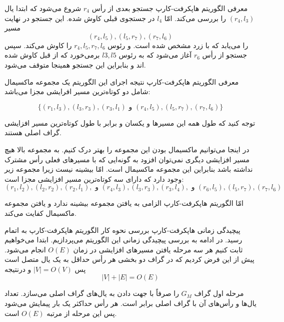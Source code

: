 \begin{itemframe}{‌معرفی الگوریتم هاپکرفت-کارپ}
\itm
 جستجو بعدی از رأس
$r_4$
شروع می‌شود که ابتدا یال
$(r_4, l_3)$
را بررسی می‌کند. امّا
$l_4$
در جستجوی قبلی کاوش شده. این جستجو در نهایت مسیر
$$(r_4, l_5), (l_5, r_7), (r_7, l_6)$$
را می‌یابد که با زرد مشخص شده است. و رئوس
$r_4, l_5, r_7, l_6$
را کاوش می‌کند.
\itm
سپس جستجو از رأس
$r_6$
آغاز می‌شود که به رئوس
$l3, l5$
برمی‌خورد که از قبل کاوش شده اند و بنابراین این جستجو همینجا متوقف می‌شود.
\end{itemframe}

\begin{itemframe}{‌معرفی الگوریتم هاپکرفت-کارپ}
\itm
نتیجه اجرای این الگوریتم یک مجموعه ماکسیمال شامل دو کوتاه‌ترین مسیر‌ افرایشی مجزا می‌باشد:

$$
\{(r_1, l_3), (l_3, r_3), (r_3, l_1) \text{ و } (r_4, l_5), (l_5, r_7), (r_7, l_6) \}
$$

توجه کنید که طول همه این مسیر‌ها و یکسان و برابر با طول کوتاه‌ترین مسیر افزایشی گراف اصلی هستند.

\itm
در اینجا می‌توانیم ماکسیمال بودن این مجموعه را بهتر درک کنیم. به مجموعه بالا هیچ مسیر افزایشی دیگری نمی‌توان افزود به گونه‌ایی که با مسیرهای فعلی رأس مشترک نداشته باشد بنابراین این مجموعه ماکسیمال است. امّا بیشینه نیست زیرا مجموعه زیر وجود دارد که دارای سه کوتاه‌ترین مسیر افزایشی مجزا است:
$$
(r_1, l_2) ,(l_2, r_2), (r_2, l_1), \text{ و } (r_4, l_3), (l_3, r_3), (r_3, l_4), \text{ و } (r_6, l_5),  (l_5, r_7),  (r_7, l_6)
$$

\itm
امّا الگوریتم هاپکرفت-کارپ الزامی به یافتن مجموعه بیشینه ندارد و یافتن مجموعه ماکسیمال کفایت می‌کند.

\end{itemframe}

\begin{itemframe}{‌پیچیدگی زمانی هاپکرفت-کارپ}
\itm
بررسی نحوه کار الگوریتم هاپکرفت-کارپ به اتمام رسید. در ادامه به بررسی پیچیدگی زمانی این الگوریتم می‌پردازیم.
\itm
ابتدا می‌خواهیم ثابت کنیم هر سه مرحله یافتن مسیرهای افزایشی در زمان $O(E)$ انجام می‌شود. پیش از این فرض کردیم که در گراف دو بخشی هر رأس حداقل به یک یال متصل است پس
$|V| = O(V)$
و درنتیجه
$$|V| + |E| = O(E)$$

\itm
مرحله اول گراف
$G_M$
را صرفاً با جهت دادن به یال‌های گراف اصلی می‌سازد. تعداد یال‌ها و رأس‌های آن با گراف اصلی برابر است. هر رأس حداکثر یک بار پیمایش می‌شود پس این مرحله از مرتبه $O(E)$ است.
\end{itemframe}

